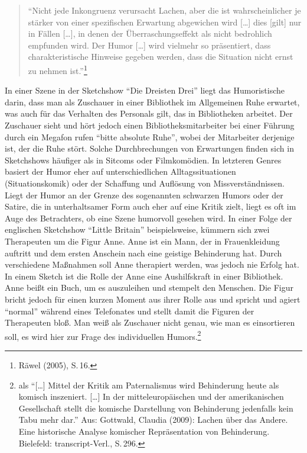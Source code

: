 \begin{flushleft}
\begin{quote}
\enquote{Nicht jede Inkongruenz verursacht Lachen, aber die ist
wahrscheinlicher je stärker von einer spezifischen Erwartung abgewichen
wird {[}\ldots{}{]} dies {[}gilt{]} nur in Fällen {[}\ldots{}{]}, in
denen der Überraschungseffekt als nicht bedrohlich empfunden wird. Der
Humor {[}\ldots{}{]} wird vielmehr so präsentiert, dass
charakteristische Hinweise gegeben werden, dass die Situation nicht
ernst zu nehmen ist.}\footnote{Räwel (2005), S.\,16.}
\end{quote}
\end{flushleft}

In einer Szene in der Sketchshow \enquote{Die Dreisten Drei} liegt das
Humoristische darin, dass man als Zuschauer in einer Bibliothek im
Allgemeinen Ruhe erwartet, was auch für das Verhalten des Personals
gilt, das in Bibliotheken arbeitet. Der Zuschauer sieht und hört jedoch
einen Bibliotheksmitarbeiter bei einer Führung durch ein Megafon rufen
\enquote{bitte absolute Ruhe}, wobei der Mitarbeiter derjenige ist, der
die Ruhe stört. Solche Durchbrechungen von Erwartungen finden sich in
Sketchshows häufiger als in Sitcoms oder Filmkomödien. In letzteren
Genres basiert der Humor eher auf unterschiedlichen Alltagssituationen
(Situationskomik) oder der Schaffung und Auflösung von
Missverständnissen. Liegt der Humor an der Grenze des sogenannten
schwarzen Humors oder der Satire, die in unterhaltsamer Form
auch eher auf eine Kritik zielt, liegt es oft im Auge des Betrachters,
ob eine Szene humorvoll gesehen wird. In einer Folge der englischen
Sketchshow \enquote{Little Britain} beispielsweise, kümmern sich zwei
Therapeuten um die Figur Anne. Anne ist ein Mann, der in Frauenkleidung
auftritt und dem ersten Anschein nach eine geistige Behinderung hat.
Durch verschiedene Maßnahmen soll Anne therapiert werden, was jedoch nie
Erfolg hat. In einem Sketch ist die Rolle der Anne eine Aushilfskraft in
einer Bibliothek. Anne beißt ein Buch, um es auszuleihen und stempelt
den Menschen. Die Figur bricht jedoch für einen kurzen Moment aus ihrer
Rolle aus und spricht und agiert \enquote{normal} während eines
Telefonates und stellt damit die Figuren der Therapeuten bloß. Man weiß
als Zuschauer nicht genau, wie man es einsortieren soll, es wird hier
zur Frage des individuellen Humors.\footnote{als \enquote{{[}\ldots{}{]}
  Mittel der Kritik am Paternalismus wird Behinderung heute als komisch
  inszeniert. {[}\ldots{}{]} In der mitteleuropäischen und der
  amerikanischen Gesellschaft stellt die komische Darstellung von
  Behinderung jedenfalls kein Tabu mehr dar.} Aus: Gottwald, Claudia
  (2009): Lachen über das Andere. Eine historische Analyse komischer
  Repräsentation von Behinderung. Bielefeld: transcript-Verl., S.\,296.}

